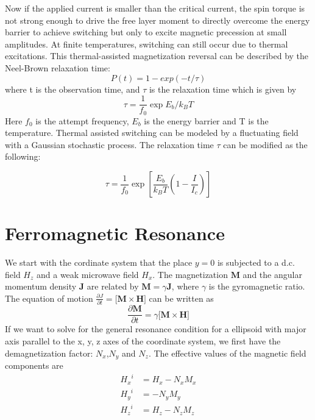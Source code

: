 Now if the applied current is smaller than the critical current, the spin torque is not strong enough to drive the free layer moment to directly overcome the energy barrier to achieve switching but only to excite magnetic precession at small amplitudes. At finite temperatures, switching can still occur due to thermal excitations. This thermal-assisted magnetization reversal can be described by the Neel-Brown relaxation time:
\begin{equation}
P(t) = 1 - exp(-t/\tau)
\end{equation}
where t is the observation time, and $\tau$ is the relaxation time which is given by
\begin{equation}
\tau = \frac{1}{f_0}\exp{E_b/k_B T}
\end{equation}
Here $f_0$ is the attempt frequency, $E_b$ is the energy barrier and T is the temperature. Thermal assisted switching can be modeled by a fluctuating field with a Gaussian stochastic process. The relaxation time $\tau$ can be modified as the following:

\begin{equation}
\tau = \frac{1}{f_0}\exp [\frac{E_b}{k_B T}(1 - \frac{I}{I_c})]
\end{equation}


\section{Ferromagnetic Resonance}
We start with the cordinate system that the place $y=0$ is subjected to a d.c. field $H_z$ and a weak microwave field $H_x$. The magnetization $\boldsymbol{M}$ and the angular momentum density $\boldsymbol{J}$ are related by $\boldsymbol{M} = \gamma \boldsymbol{J}$\cite{Kittel1947}\cite{Kittel}, where $\gamma$ is the gyromagnetic ratio. The equation of motion $\frac{\partial J}{\partial t} = \big[\boldsymbol{M} \times \boldsymbol{H}]$ can be written as 
\begin{equation}
    \label{eq:Mmotion}
    \frac{\partial \boldsymbol{M}}{\partial t} = \gamma \big[\boldsymbol{M} \times \boldsymbol{H}]
\end{equation}
If we want to solve for the general resonance condition for a ellipsoid with major axis parallel to the x, y, z axes of the coordinate system, we first have the demagnetization factor: $N_x$,$N_y$ and $N_z$. The effective values of the magnetic field components are
\begin{equation}
\label{eq:MvsT}
\begin{aligned}
{H_x}^i &= H_x - N_x M_x \\
{H_y}^i &=  - N_y M_y \\
{H_z}^i &= H_z - N_z M_z \\
\end{aligned}
\end{equation}

